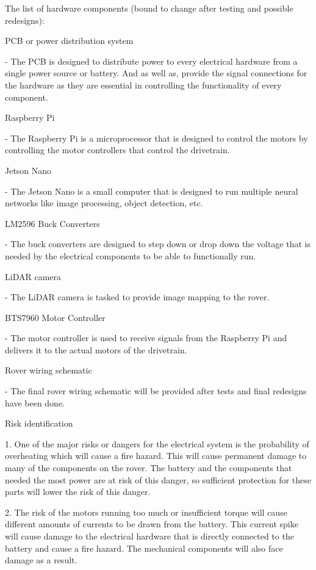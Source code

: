 \documentclass[a4paper, 10pt]{article}
\begin{document}
The list of hardware components (bound to change after testing and possible redesigns):

PCB or power distribution system

- The PCB is designed to distribute power to every electrical hardware from a single power source or battery. And as well as, provide the signal connections for the hardware as they are essential in controlling the functionality of every component.

Raspberry Pi

- The Raspberry Pi is a microprocessor that is designed to control the motors by controlling the motor controllers that control the drivetrain.

Jetson Nano

- The Jetson Nano is a small computer that is designed to run multiple neural networks like image processing, object detection, etc. 

LM2596 Buck Converters

- The buck converters are designed to step down or drop down the voltage that is needed by the electrical components to be able to functionally run.

LiDAR camera

- The LiDAR camera is tasked to provide image mapping to the rover.

BTS7960 Motor Controller

- The motor controller is used to receive signals from the Raspberry Pi and delivers it to the actual motors of the drivetrain.

Rover wiring schematic

- The final rover wiring schematic will be provided after tests and final redesigns have been done. 

Risk identification

1. One of the major risks or dangers for the electrical system is the probability of overheating which will cause a fire hazard. This will cause permanent damage to many of the components on the rover. The battery and the components that needed the most power are at risk of this danger, so sufficient protection for these parts will lower the risk of this danger.

2. The risk of the motors running too much or insufficient torque will cause different amounts of currents to be drawn from the battery. This current spike will cause damage to the electrical hardware that is directly connected to the battery and cause a fire hazard. The mechanical components will also face damage as a result.
\end{document}
